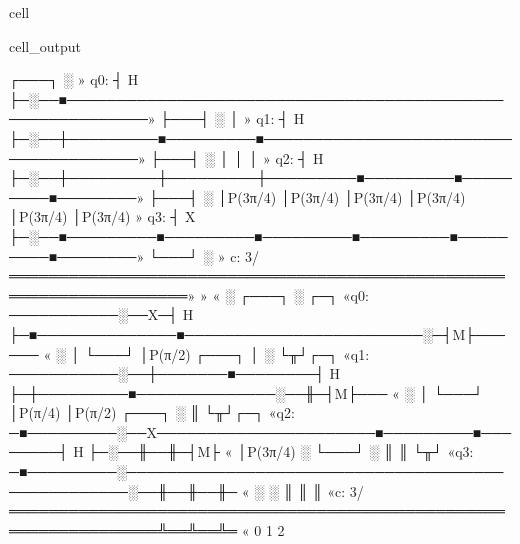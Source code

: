 \documentclass[letterpaper,10pt,english]{jupyterBook}
\begin{document}
\begin{sphinxuseclass}{cell}
\begin{sphinxVerbatimOutput}
\begin{sphinxuseclass}{cell_output}
\begin{sphinxVerbatim}[commandchars=\\\{\}]
     ┌───┐ ░                                                             »
q\PYGZus{}0: ┤ H ├─░──■──────────────────────────────────────────────────────────»
     ├───┤ ░  │                                                          »
q\PYGZus{}1: ┤ H ├─░──┼─────────■─────────■──────────────────────────────────────»
     ├───┤ ░  │         │         │                                      »
q\PYGZus{}2: ┤ H ├─░──┼─────────┼─────────┼─────────■─────────■─────────■────────»
     ├───┤ ░  │P(3π/4)  │P(3π/4)  │P(3π/4)  │P(3π/4)  │P(3π/4)  │P(3π/4) »
q\PYGZus{}3: ┤ X ├─░──■─────────■─────────■─────────■─────────■─────────■────────»
     └───┘ ░                                                             »
c: 3/════════════════════════════════════════════════════════════════════»
                                                                         »
«                ░    ┌───┐                                         ░ ┌─┐
«q\PYGZus{}0: ───────────░──X─┤ H ├─■──────────────■────────────────────────░─┤M├──────
«                ░  │ └───┘ │P(\PYGZhy{}π/2) ┌───┐ │                        ░ └╥┘┌─┐
«q\PYGZus{}1: ───────────░──┼───────■────────┤ H ├─┼─────────■──────────────░──╫─┤M├───
«                ░  │                └───┘ │P(\PYGZhy{}π/4)  │P(\PYGZhy{}π/2) ┌───┐ ░  ║ └╥┘┌─┐
«q\PYGZus{}2: ─■─────────░──X──────────────────────■─────────■────────┤ H ├─░──╫──╫─┤M├
«      │P(3π/4)  ░                                            └───┘ ░  ║  ║ └╥┘
«q\PYGZus{}3: ─■─────────░──────────────────────────────────────────────────░──╫──╫──╫─
«                ░                                                  ░  ║  ║  ║
«c: 3/═════════════════════════════════════════════════════════════════╩══╩══╩═
«                                                                      0  1  2
\end{sphinxVerbatim}

\end{sphinxuseclass}\end{sphinxVerbatimOutput}

\end{sphinxuseclass}
\end{document}
